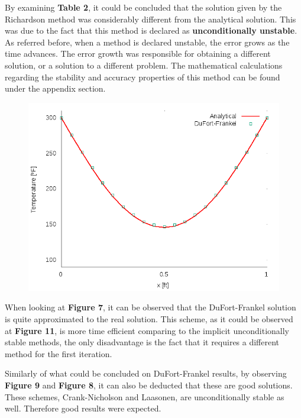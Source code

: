 \documentclass[12pt]{article}
\begin{document}
\par By examining \textbf{Table 2}, it could be concluded that the solution given by the Richardson method  was considerably different from the analytical solution. This was due to the fact that this method is declared as \textbf{unconditionally unstable}.  As referred before, when a method is declared unstable, the error grows as the time advances. The error growth was responsible for obtaining a different solution, or a solution to a different problem. The mathematical calculations regarding the stability and accuracy properties of this method can be found under the appendix section. 

\begin{figure}[!htb]
  \centering
  \includegraphics[width=.5\linewidth]{DuFort-Frankelt_0_5.png}
\end{figure}

\par When looking at \textbf{Figure 7}, it can be observed that the DuFort-Frankel solution is quite approximated to the real solution. This scheme, as it could be observed at \textbf{Figure 11}, is more time efficient comparing to the implicit unconditionally stable methods, the only disadvantage is the fact that it requires a different method for the first iteration.

\par Similarly of what could be concluded on DuFort-Frankel results, by observing \textbf{Figure 9} and \textbf{Figure 8}, it can also be deducted that these are good solutions. These schemes, Crank-Nicholson and Laasonen, are unconditionally stable as well. Therefore good results were expected.
\end{document}
